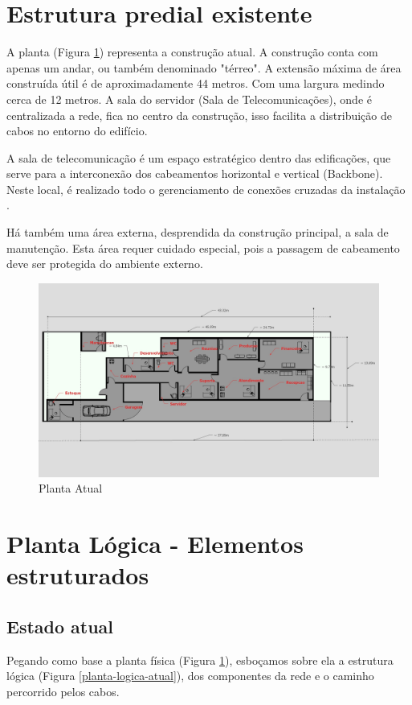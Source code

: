 \documentclass[	DIV=calc,%
							paper=a4,%
							fontsize=12pt,%
							onecolumn]{scrartcl}	 					%
\begin{document}
\section{Estrutura predial existente}

A planta (Figura \ref{planta-atual}) representa a construção atual. A construção conta com apenas um andar, ou também denominado "térreo". A extensão máxima de área construída útil é de aproximadamente 44 metros. Com uma largura medindo cerca de 12 metros. A sala do servidor (Sala de Telecomunicações), onde é centralizada a rede, fica no centro da construção, isso facilita a distribuição de cabos no entorno do edifício.

A sala de telecomunicação é um espaço estratégico dentro das edificações,
que serve para a interconexão dos cabeamentos horizontal e vertical (Backbone).
Neste local, é realizado todo o gerenciamento de conexões cruzadas da instalação \cite{senai2012}.

Há também uma área externa, desprendida da construção principal, a sala de manutenção. Esta área requer cuidado especial, pois a passagem de cabeamento deve ser protegida do ambiente externo.

\begin{figure}[H]
	\centering
	\includegraphics[width=\textwidth]{planta-atual}
	\caption{Planta Atual}
	\label{planta-atual}
\end{figure}

\section{Planta Lógica - Elementos estruturados}

\subsection{Estado atual}
Pegando como base a planta física (Figura \ref{planta-atual}), esboçamos sobre ela a estrutura lógica (Figura \ref{planta-logica-atual}), dos componentes da rede e o caminho percorrido pelos cabos.
\end{document}
